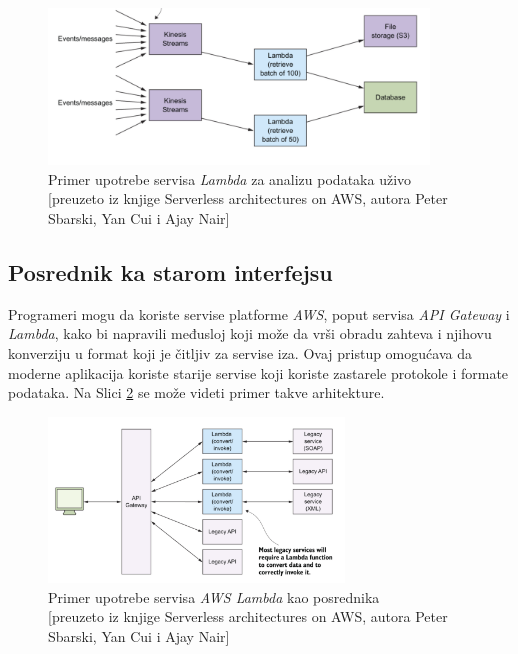 \documentclass[12pt,oneside]{memoir}
\begin{document}
\begin{figure}[!ht]
  \centering
  \includegraphics[width=0.9\textwidth]{Slika 8.png}
  \caption{Primer upotrebe servisa \emph{Lambda} za analizu podataka uživo\\\footnotesize[preuzeto iz knjige Serverless architectures on AWS, autora Peter Sbarski, Yan Cui i Ajay Nair]}
  \label{fig:AnalizaPodataka}
\end{figure}

\subsection{Posrednik ka starom interfejsu} %

Programeri mogu da koriste servise platforme \emph{AWS}, poput servisa \emph{API Gateway} i \emph{Lambda}, kako bi napravili međusloj koji može da vrši obradu zahteva i njihovu konverziju u format koji je čitljiv za servise iza. Ovaj pristup omogućava da moderne aplikacija koriste starije servise koji koriste zastarele protokole i formate podataka. Na Slici \ref{fig:KonverzijaPodataka} se može videti primer takve arhitekture.

\begin{figure}[!ht]
  \centering
  \includegraphics[width=0.7\textwidth]{Slika 9.png}
  \caption{Primer upotrebe servisa \emph{AWS Lambda} kao posrednika\\\footnotesize[preuzeto iz knjige Serverless architectures on AWS, autora Peter Sbarski, Yan Cui i Ajay Nair]}
  \label{fig:KonverzijaPodataka}
\end{figure}
\end{document}
